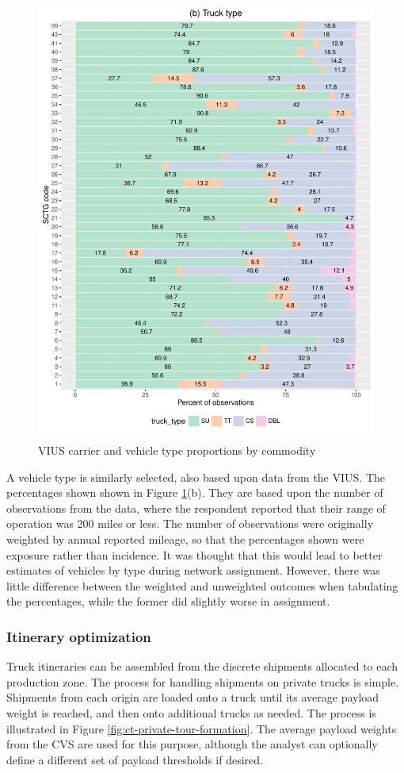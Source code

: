 \begin{figure}
\includegraphics[scale=0.65]{ct/ct-vehicle-types}
\caption{VIUS carrier and vehicle type proportions by commodity}
\label{fig:ct-carrier-vehicle-types}
\end{figure}

A vehicle type is similarly selected, also based upon data from the VIUS. The percentages shown shown in Figure \ref{fig:ct-carrier-vehicle-types}(b). They are based upon the number of observations from the data, where the respondent reported that their range of operation was 200 miles or less. The number of observations were originally weighted by annual reported mileage, so that the percentages shown were exposure rather than incidence. It was thought that this would lead to better estimates of vehicles by type during network assignment. However, there was little difference between the weighted and unweighted outcomes when tabulating the percentages, while the former did slightly worse in assignment.

\subsubsection{Itinerary optimization}\label{sec:itinerary-optimization}
Truck itineraries can be assembled from the discrete shipments allocated to each production zone. The process for handling shipments on private trucks is simple. Shipments from each origin are loaded onto a truck until its average payload weight is reached, and then onto additional trucks as needed. The process is illustrated in Figure \ref{fig:ct-private-tour-formation}. The average payload weights from the CVS are used for this purpose, although the analyst can optionally define a different set of payload thresholds if desired.

